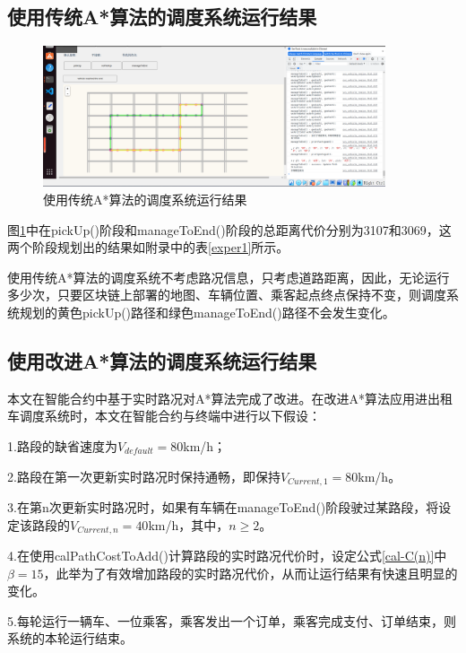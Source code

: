 \subsection{使用传统A*算法的调度系统运行结果}

\begin{figure}[ht]
  \centering
  \includegraphics[width=0.9\textwidth]{undergraduate-thesis/images/2023-05-16 (1).png}
  \caption{使用传统A*算法的调度系统运行结果}
  \label{nine-old-Taxi} %
\end{figure}

图\ref{nine-old-Taxi}中在pickUp()阶段和manageToEnd()阶段的总距离代价分别为3107和3069，这两个阶段规划出的结果如附录中的表\ref{exper1}所示。

使用传统A*算法的调度系统不考虑路况信息，只考虑道路距离，因此，无论运行多少次，只要区块链上部署的地图、车辆位置、乘客起点终点保持不变，则调度系统规划的黄色pickUp()路径和绿色manageToEnd()路径不会发生变化。

\subsection{使用改进A*算法的调度系统运行结果}

本文在智能合约中基于实时路况对A*算法完成了改进。在改进A*算法应用进出租车调度系统时，本文在智能合约与终端中进行以下假设：

1.路段的缺省速度为$V_{default}=80$km/h；

2.路段在第一次更新实时路况时保持通畅，即保持$V_{Current,1}=80$km/h。

3.在第n次更新实时路况时，如果有车辆在manageToEnd()阶段驶过某路段，将设定该路段的$V_{Current,n}=40$km/h，其中，$n\ge 2$。

4.在使用calPathCostToAdd()计算路段的实时路况代价时，设定公式\ref{cal-C(n)}中$\beta=15$，此举为了有效增加路段的实时路况代价，从而让运行结果有快速且明显的变化。

5.每轮运行一辆车、一位乘客，乘客发出一个订单，乘客完成支付、订单结束，则系统的本轮运行结束。

